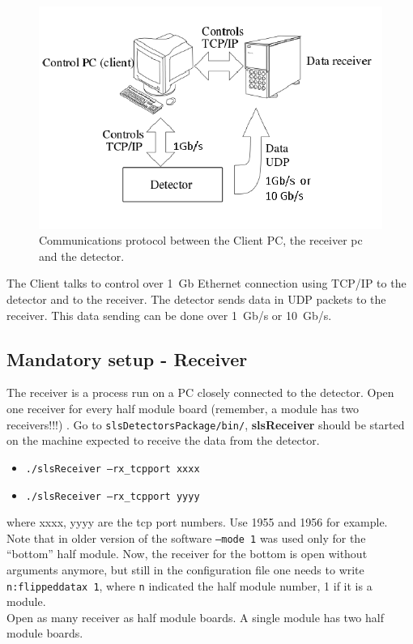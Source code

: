 \documentclass{article}
\begin{document}
\begin{figure}[t]
\begin{center}
\includegraphics[width=.8\textwidth]{Client2}
\end{center}
\caption{Communications protocol between the Client PC, the receiver pc and the detector.}
\label{fig:1}
\end{figure}

The Client talks to control over 1~Gb Ethernet connection using TCP/IP to the detector and to the receiver. The detector sends data in UDP packets to the receiver. This data sending can be done over 1~Gb/s or 10~Gb/s. 
 

\subsection{Mandatory setup - Receiver}

The receiver is a process run on a PC closely connected to the detector. Open one receiver for every half module board (remember, a module has two receivers!!!) . Go to {\tt{slsDetectorsPackage/bin/}}, \textbf{slsReceiver} should be started on the machine expected to receive the data from the detector.

\begin{itemize}
\item {\tt{./slsReceiver --rx\_tcpport xxxx}} 
\item {\tt{./slsReceiver --rx\_tcpport yyyy}}
\end{itemize}
where xxxx, yyyy are the tcp port numbers. Use 1955 and 1956 for example. Note that in older version of the software {\tt{--mode 1}} was used only for the ``bottom'' half module. Now, the receiver for the bottom is open without arguments anymore, but still in the configuration file one needs to write {\tt{n:flippeddatax 1}}, where {\tt{n}} indicated the half module number, 1 if it is a module.
\\ Open as many receiver as half module boards. A single module has two half module boards.
\end{document}
